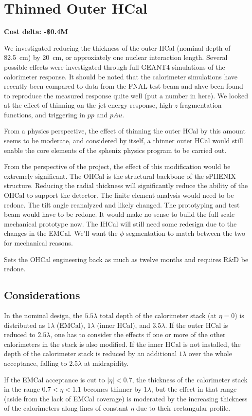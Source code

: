 \section*{Thinned Outer HCal}
\label{ohcal_thin}

\textbf{Cost delta: -\$0.4M}

We investigated reducing the thickness of the outer HCal (nominal
depth of 82.5~cm) by 20~cm, or approxiately one nuclear interaction
length.  Several possible effects were investigated through full
\textsc{GEANT4} simulations of the calorimeter response.  It should be
noted that the calorimeter simulations have recently been compared to
data from the FNAL test beam and ahve been found to reproduce the
measured response quite well (put a number in here).  We looked at the
effect of thinning on the jet energy response, high-$z$ fragmentation
functions, and triggering in $pp$ and $pAu$.

From a physics perspective, the effect of thinning the outer HCal by
this amount seems to be moderate, and considered by itself, a thinner
outer HCal would still enable the core elements of the sphenix physics
program to be carried out.

From the perspective of the project, the effect of this modification
would be extremely significant.  The OHCal is the structural backbone
of the sPHENIX structure.  Reducing the radial thickness will
significantly reduce the ability of the OHCal to support the detector.
The finite element analysis would need to be redone. The tilt angle
reanalyzed and likely changed. The prototyping and test beam would
have to be redone.  It would make no sense to build the full scale
mechanical prototype now.  The IHCal will still need some redesign due
to the changes in the EMCal. We’ll want the $\phi$ segmentation to
match between the two for mechanical reasons.

Sets the OHCal engineering back as much as twelve months and requires
R\&D be redone.

\subsection*{Considerations}

In the nominal design, the $5.5 \lambda$ total depth of the
calorimeter stack (at $\eta = 0$) is distributed as $1 \lambda$
(EMCal), $1 \lambda$ (inner HCal), and $3.5 \lambda$.  If the outer
HCal is reduced to $2.5 \lambda$, one has to consider the effects if
one or more of the other calorimeters in the stack is also modified.
If the inner HCal is not installed, the depth of the calorimeter stack
is reduced by an additional $1 \lambda$ over the whole acceptance,
falling to $2.5 \lambda$ at midrapidity.

If the EMCal acceptance is cut to $|\eta| < 0.7$, the thickness of the
calorimeter stack in the range $0.7 < \eta < 1.1$ becomes thinner by
$1 \lambda$, but the effect in that range (aside from the lack of
EMCal coverage) is moderated by the increasing thickness of the
calorimeters along lines of constant $\eta$ due to their rectangular
profile.



